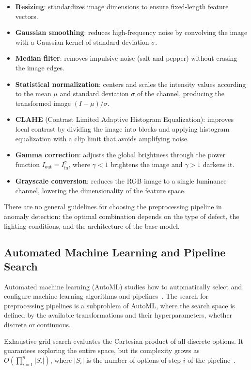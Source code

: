 \documentclass[conference]{IEEEtran}
\begin{document}
\begin{itemize}
\item \textbf{Resizing}: standardizes image dimensions to ensure fixed-length
  feature vectors.
\item \textbf{Gaussian smoothing}: reduces high-frequency noise by convolving
  the image with a Gaussian kernel of standard deviation $\sigma$.
\item \textbf{Median filter}: removes impulsive noise (salt and pepper)
  without erasing the image edges.
\item \textbf{Statistical normalization}: centers and scales the intensity
  values according to the mean $\mu$ and standard deviation $\sigma$ of the
  channel, producing the transformed image $(I - \mu)/\sigma$.
\item \textbf{CLAHE} (Contrast Limited Adaptive Histogram
  Equalization): improves local contrast by dividing the image into
  blocks and applying histogram equalization with a clip limit that avoids
  amplifying noise.
\item \textbf{Gamma correction}: adjusts the global brightness through the
  power function $I_{\text{out}} = I_{\text{in}}^{\gamma}$, where
  $\gamma < 1$ brightens the image and $\gamma > 1$ darkens it.
\item \textbf{Grayscale conversion}: reduces the RGB image to a single
  luminance channel, lowering the dimensionality of the feature space.
\end{itemize}

There are no general guidelines for choosing the preprocessing pipeline in
anomaly detection: the optimal combination depends on the type of defect, the
lighting conditions, and the architecture of the base model.

\subsection{Automated Machine Learning and Pipeline Search}

Automated machine learning (AutoML) studies how to automatically select and
configure machine learning algorithms and pipelines~\cite{yang2020automl}. The
search for preprocessing pipelines is a subproblem of AutoML, where the search
space is defined by the available transformations and their hyperparameters,
whether discrete or continuous.

Exhaustive grid search evaluates the Cartesian product of all discrete
options. It guarantees exploring the entire space, but its complexity grows as
$O\!\left(\prod_{i=1}^{n} |S_i|\right)$, where $|S_i|$ is the number of options
of step $i$ of the pipeline~\cite{hastie2009elements}.
\end{document}

